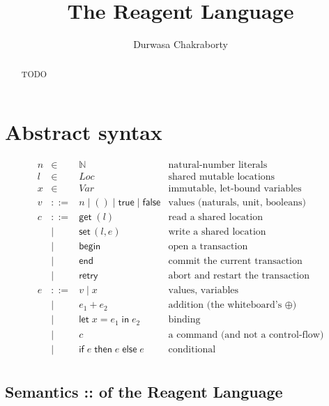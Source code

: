 \documentclass[manuscript,nonacm]{acmart}
\title{The Reagent Language}
\author{Durwasa Chakraborty}
\affiliation{%
  \institution{TODO: institution}
  \country{India}
}
\theoremstyle{acmdefinition}
\newcommand{\Loc}{\mathit{Loc}}
\newcommand{\Var}{\mathit{Var}}
\newcommand{\unit}{()}
\newcommand{\bbegin}{\textsf{begin}}
\newcommand{\eend}{\textsf{end}}
\newcommand{\retry}{\textsf{retry}}
\newcommand{\getc}[1]{\textsf{get}\;(#1)}
\newcommand{\setc}[2]{\textsf{set}\,(#1,#2)}
\begin{document}
\begin{abstract}
TODO
\end{abstract}

\maketitle

\section{Abstract syntax}

\[
\begin{array}{rcll}
n     & \in & \mathbb{N}        & \text{natural-number literals}\\
l     & \in & \Loc              & \text{shared mutable locations}\\
x     & \in & \Var              & \text{immutable, let-bound variables}\\[4pt]
v     & ::= & n \mid \unit \mid \textsf{true} \mid \textsf{false} & \text{values (naturals, unit, booleans)}\\[4pt]
c     & ::= & \getc{l}          & \text{read a shared location}\\
      & \mid & \setc{l}{e}      & \text{write a shared location}\\
      & \mid & \bbegin          & \text{open a transaction}\\
      & \mid & \eend            & \text{commit the current transaction}\\
      & \mid & \retry           & \text{abort and restart the transaction}\\[4pt]
e     & ::= & v \mid x          & \text{values, variables}\\
      & \mid & e_1 + e_2        & \text{addition (the whiteboard's }\oplus\text{)}\\
      & \mid & \textsf{let}\;x = e_1\;\textsf{in}\;e_2 & \text{binding}\\
      & \mid & c                & \text{a command (and not a control-flow)}\\
      & \mid & \textsf{if}\;e\;\textsf{then}\;e\;\textsf{else}\;e & \text{conditional}\\
\end{array}
\]



\subsection{Semantics :: of the Reagent Language}
\label{subsec:semantics}
\end{document}
